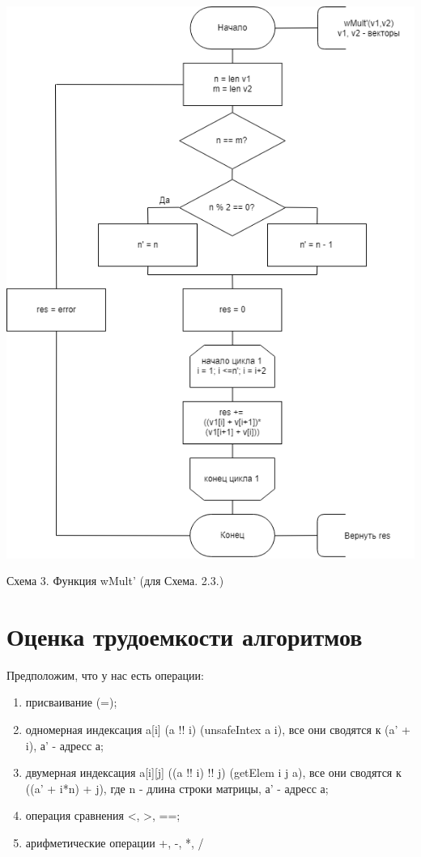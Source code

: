 \documentclass[12pt]{report}
\begin{document}
\begin{center}
    \includegraphics[scale=0.7]{wMult}

    Схема 3. Функция wMult' (для Схема. 2.3.)
\end{center}

\section{Оценка трудоемкости алгоритмов}

Предположим, что у нас есть операции:
\begin{enumerate}
	\item присваивание (=);
	\item одномерная индексация a[i] (a !! i) (unsafeIntex a i), все они сводятся к (a' + i), а' - адресс а;
	\item двумерная индексация a[i][j] ((a !! i) !! j) (getElem i j a), все они сводятся к ((a' + i*n) + j), где n - длина строки матрицы, а' - адресс а;
	\item операция сравнения <, >, ==;
	\item арифметические операции +, -, *, /
\end{enumerate}
\end{document}
